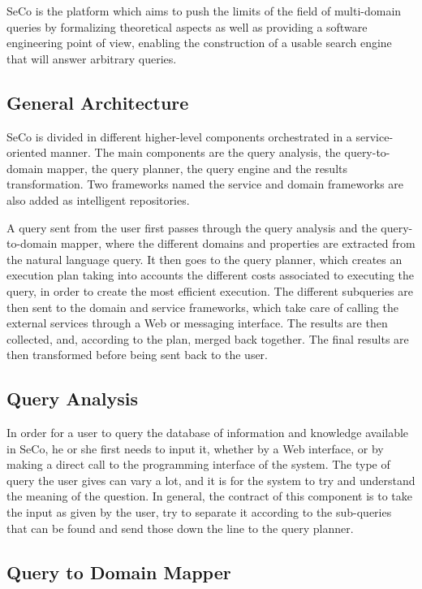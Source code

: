 SeCo is the platform which aims to push the limits of the field of multi-domain queries by formalizing theoretical aspects as well as providing a software engineering point of view, enabling the construction of a usable search engine that will answer arbitrary queries.

\subsection{General Architecture}

SeCo is divided in different higher-level components orchestrated in a service-oriented manner. The main components are the query analysis, the query-to-domain mapper, the query planner, the query engine and the results transformation. Two frameworks named the service and domain frameworks are also added as intelligent repositories.

A query sent from the user first passes through the query analysis and the query-to-domain mapper, where the different domains and properties are extracted from the natural language query. It then goes to the query planner, which creates an execution plan taking into accounts the different costs associated to executing the query, in order to create the most efficient execution. The different subqueries are then sent to the domain and service frameworks, which take care of calling the external services through a Web or messaging interface. The results are then collected, and, according to the plan, merged back together. The final results are then transformed before being sent back to the user.

\subsection{Query Analysis}

In order for a user to query the database of information and knowledge available in SeCo, he or she first needs to input it, whether by a Web interface, or by making a direct call to the programming interface of the system. The type of query the user gives can vary a lot, and it is for the system to try and understand the meaning of the question. In general, the contract of this component is to take the input as given by the user, try to separate it according to the sub-queries that can be found and send those down the line to the query planner.

\subsection{Query to Domain Mapper} %
\label{sub:query_to_domain_mapper}

